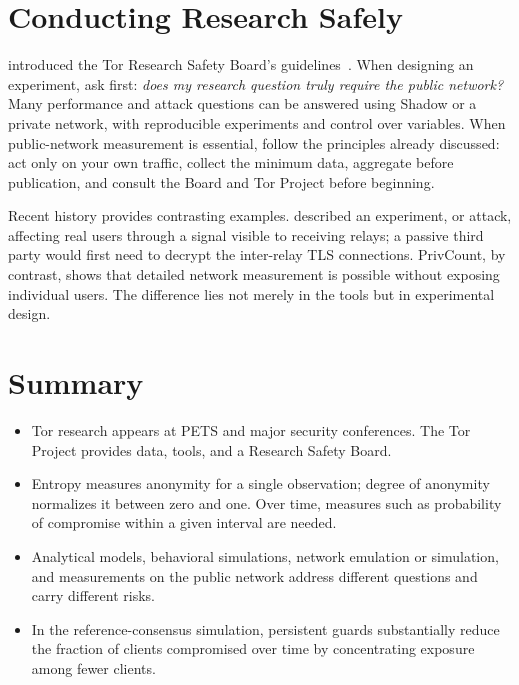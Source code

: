 \section{Conducting Research Safely}\label{sec:ric-sicurezza}

 introduced the Tor Research Safety Board's guidelines~\cite{trsb}. When designing an experiment, ask first: \emph{does my research question truly require the public network?} Many performance and attack questions can be answered using Shadow or a private network, with reproducible experiments and control over variables. When public-network measurement is essential, follow the principles already discussed: act only on your own traffic, collect the minimum data, aggregate before publication, and consult the Board and Tor Project before beginning.

Recent history provides contrasting examples.  described an experiment, or attack, affecting real users through a signal visible to receiving relays; a passive third party would first need to decrypt the inter-relay TLS connections. PrivCount, by contrast, shows that detailed network measurement is possible without exposing individual users. The difference lies not merely in the tools but in experimental design.

\section*{Summary}
\begin{itemize}
  \item Tor research appears at PETS and major security conferences. The Tor Project provides data, tools, and a Research Safety Board.
  \item Entropy measures anonymity for a single observation; degree of anonymity normalizes it between zero and one. Over time, measures such as probability of compromise within a given interval are needed.
  \item Analytical models, behavioral simulations, network emulation or simulation, and measurements on the public network address different questions and carry different risks.
  \item In the reference-consensus simulation, persistent guards substantially reduce the fraction of clients compromised over time by concentrating exposure among fewer clients.
\end{itemize}

